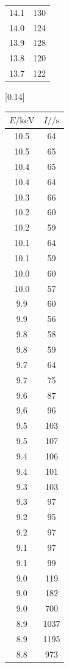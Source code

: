 \begin{table}[h! p]
{\begin{tabular}{|c c|}
    14.1 & 130 \\
    14.0 & 124 \\
    13.9 & 128 \\
    13.8 & 120 \\
    13.7 & 122 \\
    \bottomrule
  \end{tabular}
  }\qquad \hfill
  [0.14\textwidth]{
  \begin{tabular}{|c c|}
    \toprule
    $E / \si{\kilo\electronvolt}$ & $I / \si{\per\second}$ \\
    \midrule
    10.5 & 64 \\
    10.5 & 65 \\
    10.4 & 65 \\
    10.4 & 64 \\
    10.3 & 66 \\
    10.2 & 60 \\
    10.2 & 59 \\
    10.1 & 64 \\
    10.1 & 59 \\
    10.0 & 60 \\
    10.0 & 57 \\
    9.9 & 60 \\
    9.9 & 56 \\
    9.8 & 58 \\
    9.8 & 59 \\
    9.7 & 64 \\
    9.7 & 75 \\
    9.6 & 87 \\
    9.6 & 96 \\
    9.5 & 103 \\
    9.5 & 107 \\
    9.4 & 106 \\
    9.4 & 101 \\
    9.3 & 103 \\
    9.3 & 97 \\
    9.2 & 95 \\
    9.2 & 97 \\
    9.1 & 97 \\
    9.1 & 99 \\
    9.0 & 119 \\
    9.0 & 182 \\
    9.0 & 700 \\
    8.9 & 1037 \\
    8.9 & 1195 \\
    8.8 & 973 \\

\end{tabular}}
\end{table}
